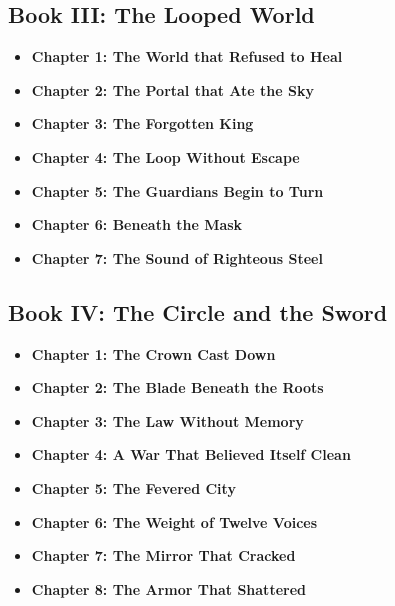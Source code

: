 \documentclass[12pt]{article}
\begin{document}
\newpage

\begin{titlepage}
\vspace*{2em}
\subsection*{Book III: The Looped World }
\begin{itemize}
  \item \textbf{Chapter 1: The World that Refused to Heal }
  \item \textbf{Chapter 2: The Portal that Ate the Sky }
  \item \textbf{Chapter 3: The Forgotten King }
  \item \textbf{Chapter 4: The Loop Without Escape }
  \item \textbf{Chapter 5: The Guardians Begin to Turn }
  \item \textbf{Chapter 6: Beneath the Mask }
  \item \textbf{Chapter 7: The Sound of Righteous Steel }
\end{itemize}

\vspace{.5in}

\subsection*{Book IV: The Circle and the Sword }
\begin{itemize}
  \item \textbf{Chapter 1: The Crown Cast Down }
  \item \textbf{Chapter 2: The Blade Beneath the Roots }
  \item \textbf{Chapter 3: The Law Without Memory }
  \item \textbf{Chapter 4: A War That Believed Itself Clean }
  \item \textbf{Chapter 5: The Fevered City }
  \item \textbf{Chapter 6: The Weight of Twelve Voices }
  \item \textbf{Chapter 7: The Mirror That Cracked }
  \item \textbf{Chapter 8: The Armor That Shattered }
\end{itemize}
\end{titlepage}
\end{document}

